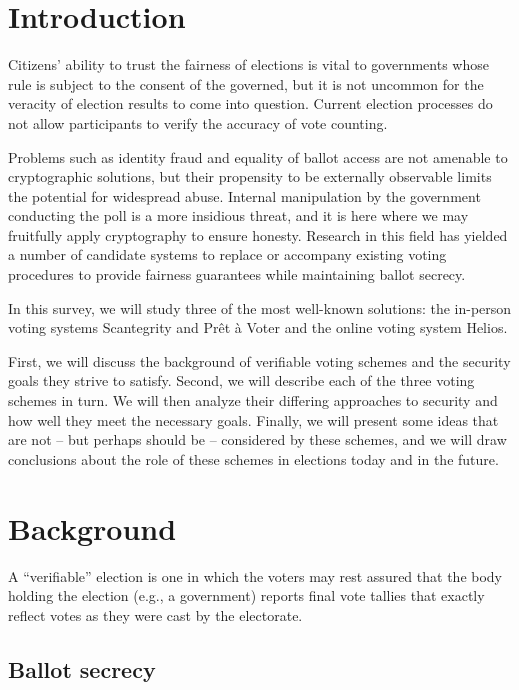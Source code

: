\documentclass[10pt]{article}
\begin{document}
\begin{multicols}{2}

\section{Introduction}

Citizens' ability to trust the fairness of elections is vital to governments whose rule is subject
to the consent of the governed, but it is not uncommon for the veracity of election results to come
into question.  Current election processes do not allow participants to verify the accuracy of vote
counting.

Problems such as identity fraud and equality of ballot access are not amenable to cryptographic
solutions, but their propensity to be externally observable limits the potential for widespread
abuse.  Internal manipulation by the government conducting the poll is a more insidious threat, and
it is here where we may fruitfully apply cryptography to ensure honesty. Research in this field has
yielded a number of candidate systems to replace or accompany existing voting procedures to provide
fairness guarantees while maintaining ballot secrecy.

In this survey, we will study three of the most well-known solutions: the in-person voting systems
Scantegrity and Pr\^{e}t \`{a} Voter and the online voting system Helios.

First, we will discuss the background of verifiable voting schemes and the security goals they
strive to satisfy. Second, we will describe each of the three voting schemes in turn. We will then
analyze their differing approaches to security and how well they meet the necessary goals. Finally,
we will present some ideas that are not -- but perhaps should be -- considered by these schemes, and
we will draw conclusions about the role of these schemes in elections today and in the future.

\section{Background}

A ``verifiable'' election is one in which the voters may rest assured that the body holding the
election (e.g., a government) reports final vote tallies that exactly reflect votes as they were
cast by the electorate.

\subsection{Ballot secrecy}


\end{multicols}
\end{document}
